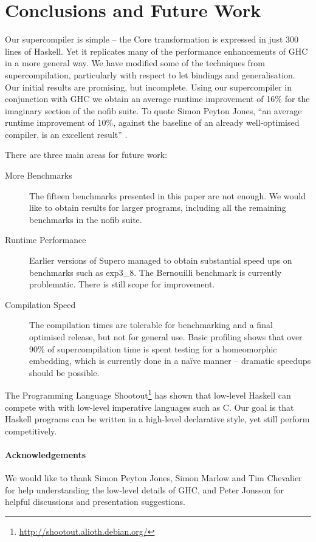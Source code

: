 \section{Conclusions and Future Work}
\label{sec:conclusion}

Our supercompiler is simple -- the Core transformation is expressed in just 300 lines of Haskell. Yet it replicates many of the performance enhancements of GHC in a more general way. We have modified some of the techniques from supercompilation, particularly with respect to let bindings and generalisation. Our initial results are promising, but incomplete. Using our supercompiler in conjunction with GHC we obtain an average runtime improvement of 16\% for the imaginary section of the nofib suite. To quote Simon Peyton Jones, ``an average runtime improvement of 10\%, against the baseline of an already well-optimised compiler, is an excellent result'' \cite{spj:specconstr}.

There are three main areas for future work:

\begin{description}
\item[More Benchmarks] The fifteen benchmarks presented in this paper are not enough. We would like to obtain results for larger programs, including all the remaining benchmarks in the nofib suite.
\item[Runtime Performance] Earlier versions of Supero \cite{me:supero_ifl} managed to obtain substantial speed ups on benchmarks such as exp3\_8. The Bernouilli benchmark is currently problematic. There is still scope for improvement.
\item[Compilation Speed] The compilation times are tolerable for benchmarking and a final optimised release, but not for general use. Basic profiling shows that over 90\% of supercompilation time is spent testing for a homeomorphic embedding, which is currently done in a na\"{i}ve manner -- dramatic speedups should be possible.
\end{description}

The Programming Language Shootout\footnote{\url{http://shootout.alioth.debian.org/}} has shown that low-level Haskell can compete with with low-level imperative languages such as C. Our goal is that Haskell programs can be written in a high-level declarative style, yet still perform competitively.

\paragraph{Acknowledgements} We would like to thank Simon Peyton Jones, Simon Marlow and Tim Chevalier for help understanding the low-level details of GHC, and Peter Jonsson for helpful discussions and presentation suggestions.

